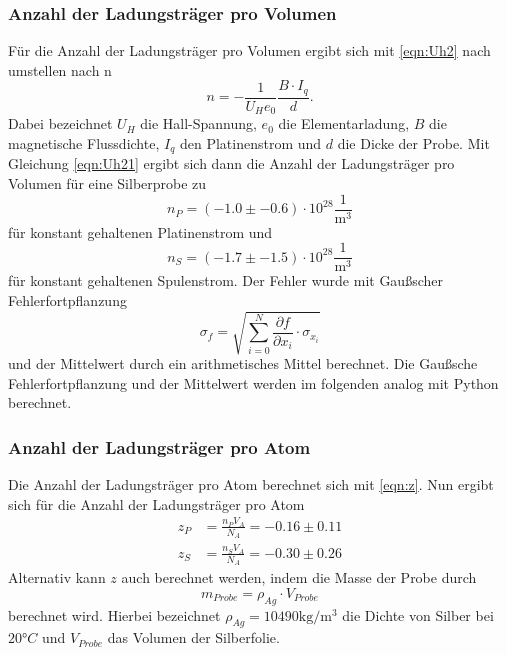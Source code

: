     \subsubsection{Anzahl der Ladungsträger pro Volumen}
    \label{sec:ladtrprovol}
        Für die Anzahl der Ladungsträger pro Volumen ergibt sich mit \ref{eqn:Uh2} nach umstellen nach n
        \begin{equation}
            n=-\frac{1}{U_{H} e_0}\frac{B\cdot I_q}{d}. \label{eqn:Uh21}
          \end{equation}
          Dabei bezeichnet $U_{H}$ die Hall-Spannung, $e_{0}$ die Elementarladung, $B$ die magnetische Flussdichte, $I_{q}$ den Platinenstrom und $d$ die Dicke
          der Probe. Mit Gleichung \ref{eqn:Uh21} ergibt sich dann die Anzahl der Ladungsträger pro Volumen für eine Silberprobe zu
          \begin{equation*}
            n_{P} = (-1.0 \pm -0.6) \cdot 10^{28} \frac{1}{\si{\cubic\meter}}
          \end{equation*}
          für konstant gehaltenen Platinenstrom und
          \begin{equation*}
            n_{S} = (-1.7 \pm -1.5) \cdot 10^{28} \frac{1}{\si{\cubic\meter}}
          \end{equation*}
        für konstant gehaltenen Spulenstrom.
        Der Fehler wurde mit Gaußscher Fehlerfortpflanzung
        \begin{equation}
          \sigma_f = \sqrt{\sum_{i=0}^{N} {\frac{\partial f}{\partial x_i} \cdot \sigma_{x_i}}}
          \label{eqn:gauss}
        \end{equation}
        und der Mittelwert durch ein arithmetisches Mittel berechnet. Die Gaußsche Fehlerfortpflanzung und der
        Mittelwert werden im folgenden analog mit Python berechnet.
    \subsubsection{Anzahl der Ladungsträger pro Atom}
      Die Anzahl der Ladungsträger pro Atom berechnet sich mit \ref{eqn:z}.
       Nun ergibt sich für die Anzahl der Ladungsträger pro Atom
       \begin{align*}
         z_{P} & = \frac{n_{P} V_{A}}{N_A} = -0.16 \pm 0.11 \\
         z_{S} & = \frac{n_{S} V_{A}}{N_A} = -0.30 \pm 0.26
       \end{align*}
       Alternativ kann $z$ auch berechnet werden, indem die Masse der Probe durch
       \begin{equation*}
         m_{Probe} = \rho_{Ag} \cdot V_{Probe}
       \end{equation*}
       berechnet wird. Hierbei bezeichnet $\rho_{Ag} = 10490 \si{\kilo\gram\per\cubic\meter}$ die Dichte von Silber
       bei $20 °C$ und $V_{Probe}$ das Volumen der Silberfolie.
